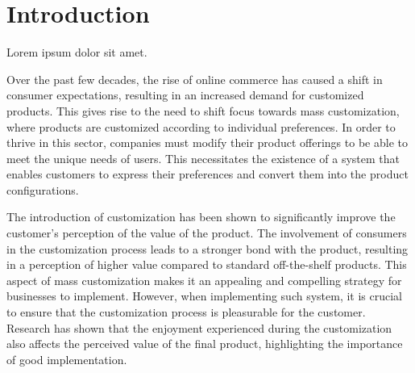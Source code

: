 \chapter*{Introduction}
\setcounter{page}{1}

\begin{chapterabstract}
	Lorem ipsum dolor sit amet.
\end{chapterabstract}

Over the past few decades, the rise of online commerce has caused a shift in consumer expectations, resulting in an increased demand for customized products. This gives rise to the need to shift focus towards mass customization, where products are customized according to individual preferences. In order to thrive in this sector, companies must modify their product offerings to be able to meet the unique needs of users. This necessitates the existence of a system that enables customers to express their preferences and convert them into the product configurations. \cite{Fulkerson2000}

The introduction of customization has been shown to significantly improve the customer's perception of the value of the product. The involvement of consumers in the customization process leads to a stronger bond with the product, resulting in a perception of higher value compared to standard off-the-shelf products. This aspect of mass customization makes it an appealing and compelling strategy for businesses to implement. \cite{Schreier2006} However, when implementing such system, it is crucial to ensure that the customization process is pleasurable for the customer. Research has shown that the enjoyment experienced during the customization also affects the perceived value of the final product, highlighting the importance of good implementation. \cite{Franke2010}

